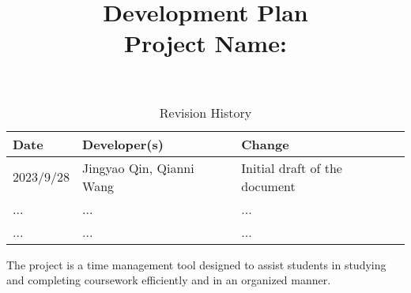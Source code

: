 \documentclass{article}
\title{\textbf{Development Plan}\\\textbf{Project Name: \progname}}
\author{\authname}
\date{}
\begin{document}
\maketitle

\begin{table}[hp]
\caption{Revision History} \label{TblRevisionHistory}
\begin{tabularx}{\textwidth}{llX}
\toprule
\textbf{Date} & \textbf{Developer(s)} & \textbf{Change}\\
\midrule
2023/9/28 & Jingyao Qin, Qianni Wang  & Initial draft of the document\\
... & ... & ...\\
... & ... & ...\\
\bottomrule
\end{tabularx}
\end{table}

The project is a time management tool designed to assist students in studying and completing coursework efficiently and in an organized manner.
\end{document}
